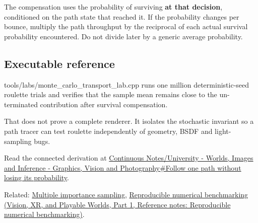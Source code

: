 \hypertarget{appendix-7277c62d4599-conditional-probability-matters}{}

The compensation uses the probability of surviving \textbf{at that decision}, conditioned on the path state that reached it. If the probability changes per bounce, multiply the path throughput by the reciprocal of each actual survival probability encountered. Do not divide later by a generic average probability.

\subsection{Executable reference}\label{appendix-7277c62d4599-executable-reference}

\hypertarget{appendix-7277c62d4599-executable-reference}{}

tools/labs/monte\_carlo\_transport\_lab.cpp runs one million deterministic-seed roulette trials and verifies that the sample mean remains close to the un-terminated contribution after survival compensation.

That does not prove a complete renderer. It isolates the stochastic invariant so a path tracer can test roulette independently of geometry, BSDF and light-sampling bugs.

Read the connected derivation at \hyperref[03-visual-computing-i-ch007-follow-one-path-without-losing-its-probability]{Continuous Notes/University - Worlds, Images and Inference - Graphics, Vision and Photography\#Follow one path without losing its probability}.

Related: \hyperref[appendix-ca8898faf1a6]{Multiple importance sampling}, \href{../07-Vision-XR-and-Playable-Worlds-P01/main.pdf\#nameddest=appendix-b9db93e28371}{Reproducible numerical benchmarking (Vision, XR, and Playable Worlds, Part 1, Reference notes: Reproducible numerical benchmarking)}.
